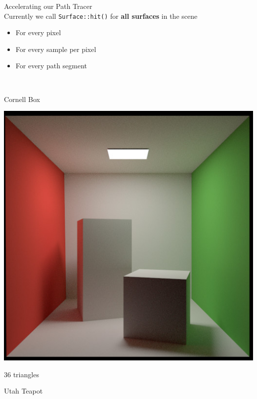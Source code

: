 \documentclass[utf8,stillsansserifmath,fleqn,t]{beamer}
\newcommand{\code}[1]{\texttt{#1}}
\begin{document}
\begin{frame}[label=acceleration-1]
\frametitle{\insertsection}
Accelerating our Path Tracer\\[1ex]
Currently we call \code{Surface::hit()} for \textbf{all surfaces} in the scene
\begin{itemize}
\item For every pixel
\item For every sample per pixel
\item For every path segment
\end{itemize}
~\\
\begin{minipage}{.23\textwidth}
\centerline{Cornell Box}
\centerline{\includegraphics[width=\textwidth]{./fig/trianglecount-cornellbox.jpg}}
\centerline{36 triangles}
\end{minipage}\hfill
\begin{minipage}{.23\textwidth}
\centerline{Utah Teapot}

\end{minipage}
\end{frame}
\end{document}
